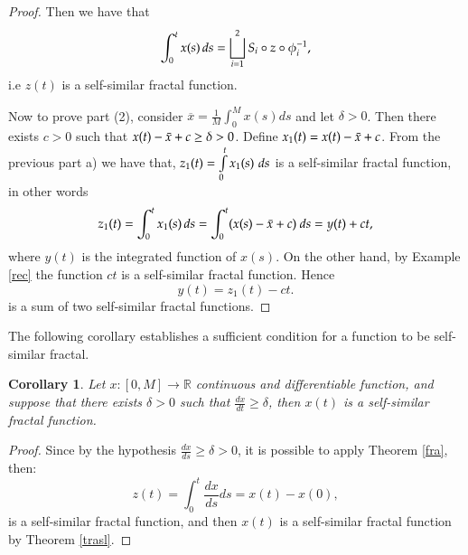 \documentclass{amsart}
\newtheorem{corollary}[theorem]{Corollary}
\newcommand{\R}{{\mathbb{R}}}
\begin{document}
\begin{proof}
Then we have that
 \begin{equation*}
     \int_{0}^{t} x(s)\thinspace ds=\bigsqcup_{i=1}^{2}S_i\circ z\circ \phi^{-1}_i,
 \end{equation*}
i.e $z(t)$ is a self-similar fractal function.

Now to prove part (2), consider $\overline{x}=\frac{1}{M}\int_{0}^M x(s)ds$ and let $\delta>0$. Then  there exists $c>0$ such that $x(t)-\Bar{x}+c\geq \delta> 0$. Define $x_1(t)=x(t)-\Bar{x}+c$. From the previous part a) we have that,  $z_1(t)=\int \limits_{0}^{t} x_1(s)\thinspace\thinspace ds$ is a self-similar fractal function, in other words 
\begin{equation*}
    z_1(t)=\int_{0}^{t} x_1(s)\thinspace ds=\int_{0}^{t} (x(s)-\Bar{x}+c)\ ds = y(t)+ct,
\end{equation*}
where $y(t)$ is the integrated function of $x(s)$. On the other hand, by Example \ref{rec} the function $ct$ is a self-similar fractal function. Hence
\begin{equation*}
    y(t)=z_1(t)-ct.
\end{equation*}
  is  a sum of two self-similar fractal functions.  
\end{proof}
The following corollary establishes a sufficient condition for a function to be self-similar fractal.
\begin{corollary}\label{app2}
Let $x:[0,M]\rightarrow \R$ continuous and differentiable function, and suppose that there exists $\delta>0$ such that $\frac{dx}{dt}\geq \delta$, then $x(t)$ is a self-similar fractal function.
\end{corollary}
\begin{proof}
Since by the hypothesis $\frac{dx}{ds}\geq \delta >0$, it is possible to apply  Theorem \ref{fra}, then:
\begin{equation*}
    z(t)=\int_0^t \frac{d x}{ds} ds = x(t)-x(0),
\end{equation*}
is a self-similar fractal function, and then $x(t)$ is a self-similar fractal function by Theorem \ref{trasl}. 
\end{proof}
\end{document}
